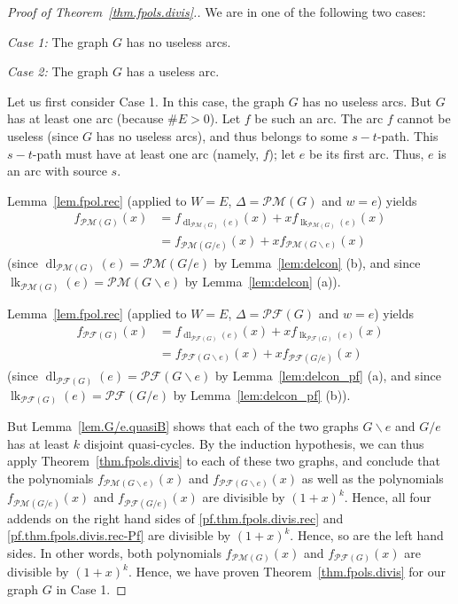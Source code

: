 \documentclass[12pt]{amsart}
\theoremstyle{definition}
\DeclareMathOperator{\lk}{lk}
\DeclareMathOperator{\dl}{dl}
\newcommand{\tup}[1]{\left( #1 \right)}
\newcommand{\Pm}[1]{\mathcal{PM}\left(#1\right)}
\newcommand{\Pf}[1]{\mathcal{PF}\left(#1\right)}
\begin{document}
\begin{proof}[Proof of Theorem~\ref{thm.fpols.divis}.]
We are in one of the following two cases:

\textit{Case 1:} The graph $G$ has no useless arcs.

\textit{Case 2:} The graph $G$ has a useless arc.

Let us first consider Case 1. In this case, the graph $G$ has no useless arcs.
But $G$ has at least one arc (because $\# E > 0$).
Let $f$ be such an arc.
The arc $f$ cannot be useless (since $G$ has no useless arcs),
and thus belongs to some $s-t$-path.
This $s-t$-path must have at least one arc (namely, $f$);
let $e$ be its first arc.
Thus, $e$ is an arc with source $s$.

Lemma~\ref{lem.fpol.rec} (applied to $W = E$, $\Delta = \Pm{G}$
and $w = e$) yields
\begin{align}
f_{\Pm{G}}\tup{x}
& = f_{\dl_{\Pm{G}}(e)}\tup{x} + x f_{\lk_{\Pm{G}}(e)}\tup{x} \nonumber\\
& = f_{\Pm{G/e}}\tup{x} + x f_{\Pm{G \backslash e}}\tup{x}
\label{pf.thm.fpols.divis.rec}
\end{align}
(since $\dl_{\Pm{G}}(e) = \Pm{G/e}$ by Lemma~\ref{lem:delcon} (b),
and since $\lk_{\Pm{G}}(e) = \Pm{G \backslash e}$ by Lemma~\ref{lem:delcon} (a)).

Lemma~\ref{lem.fpol.rec} (applied to $W = E$, $\Delta = \Pf{G}$
and $w = e$) yields
\begin{align}
f_{\Pf{G}}\tup{x}
& = f_{\dl_{\Pf{G}}(e)}\tup{x} + x f_{\lk_{\Pf{G}}(e)}\tup{x} \nonumber\\
& = f_{\Pf{G \backslash e}}\tup{x} + x f_{\Pf{G / e}}\tup{x}
\label{pf.thm.fpols.divis.rec-Pf}
\end{align}
(since $\dl_{\Pf{G}}(e) = \Pf{G \backslash e}$ by Lemma~\ref{lem:delcon_pf} (a),
and since $\lk_{\Pf{G}}(e) = \Pf{G/e}$ by Lemma~\ref{lem:delcon_pf} (b)).

But Lemma~\ref{lem.G/e.quasiB} shows that
each of the two graphs $G \backslash e$ and $G / e$
has at least $k$ disjoint quasi-cycles.
By the induction hypothesis, we can thus apply Theorem~\ref{thm.fpols.divis} to each of these two graphs,
and conclude that
the polynomials $f_{\Pm{G \backslash e}}\tup{x}$
and $f_{\Pf{G \backslash e}}\tup{x}$ as well as
the polynomials $f_{\Pm{G/e}}\tup{x}$
and $f_{\Pf{G/e}}\tup{x}$
are divisible by $\tup{1+x}^k$.
Hence, all four addends on the right hand sides of
\eqref{pf.thm.fpols.divis.rec} and
\eqref{pf.thm.fpols.divis.rec-Pf} are divisible by $\tup{1+x}^k$.
Hence, so are the left hand sides.
In other words, both
polynomials $f_{\Pm{G}}\tup{x}$ and $f_{\Pf{G}}\tup{x}$ are divisible by $\tup{1+x}^k$.
Hence, we have proven Theorem~\ref{thm.fpols.divis} for our graph $G$
in Case 1.


\end{proof}
\end{document}
